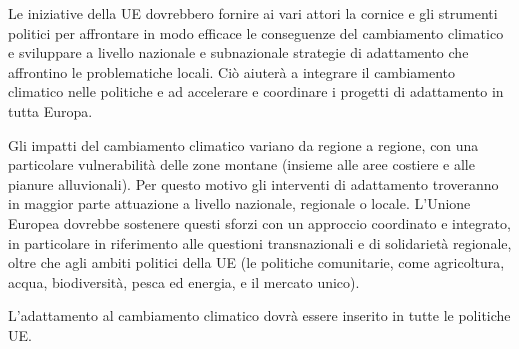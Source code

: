 \documentclass[14pt,a4paper]{article}
\begin{document}
		Le iniziative della UE dovrebbero fornire ai vari attori la cornice e gli strumenti politici per affrontare in modo efficace le conseguenze del cambiamento climatico e
		sviluppare a livello nazionale e subnazionale
		strategie di adattamento che affrontino le problematiche locali. Ciò aiuterà a integrare il cambiamento climatico nelle politiche e ad accelerare e coordinare i progetti di
		adattamento in tutta Europa.
		
		Gli impatti del cambiamento climatico variano da
		regione a regione, con una particolare vulnerabilità
		delle zone montane (insieme alle aree costiere e
		alle pianure alluvionali). Per questo motivo gli
		interventi di adattamento troveranno in maggior
		parte attuazione a livello nazionale, regionale o
		locale. L'Unione Europea dovrebbe sostenere questi
		sforzi con un approccio coordinato e integrato,
		in particolare in riferimento alle questioni
		transnazionali e di solidarietà regionale, oltre
		che agli ambiti politici della UE (le politiche
		comunitarie, come agricoltura, acqua, biodiversità,
		pesca ed energia, e il mercato unico). 
		
		L'adattamento al cambiamento climatico dovrà essere inserito in tutte le politiche UE.
				
	\newpage
	
	
	
%
\end{document}
